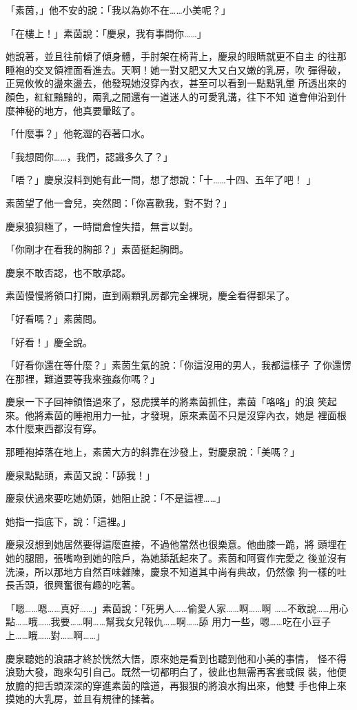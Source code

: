 「素茵，」他不安的說：「我以為妳不在……小美呢？」

「在樓上！」素茵說：「慶泉，我有事問你……」

她說著，並且往前傾了傾身體，手肘架在椅背上，慶泉的眼睛就更不自主
的往那睡袍的交叉領裡面看進去。天啊！她一對又肥又大又白又嫩的乳房，吹
彈得破，正晃攸攸的盪來盪去，他發現她沒穿內衣，甚至可以看到一點點乳暈
所透出來的顏色，紅紅黯黯的，兩乳之間還有一道迷人的可愛乳溝，往下不知
道會伸沿到什麼神秘的地方，他真要暈眩了。

「什麼事？」他乾澀的吞著口水。

「我想問你……，我們，認識多久了？」

「唔？」慶泉沒料到她有此一問，想了想說：「十……十四、五年了吧！
」

素茵望了他一會兒，突然問：「你喜歡我，對不對？」

慶泉狼狽極了，一時間倉惶失措，無言以對。

「你剛才在看我的胸部？」素茵挺起胸問。

慶泉不敢否認，也不敢承認。

素茵慢慢將領口打開，直到兩顆乳房都完全裸現，慶全看得都呆了。

「好看嗎？」素茵問。

「好看！」慶全說。

「好看你還在等什麼？」素茵生氣的說：「你這沒用的男人，我都這樣子
了你還愣在那裡，難道要等我來強姦你嗎？」

慶泉一下子回神領悟過來了，惡虎撲羊的將素茵抓住，素茵「咯咯」的浪
笑起來。他將素茵的睡袍用力一扯，才發現，原來素茵不只是沒穿內衣，她是
裡面根本什麼東西都沒有穿。

那睡袍掉落在地上，素茵大方的斜靠在沙發上，對慶泉說：「美嗎？」

慶泉點點頭，素茵又說：「舔我！」

慶泉伏過來要吃她奶頭，她阻止說：「不是這裡……」

她指一指底下，說：「這裡。」

慶泉沒想到她居然要得這麼直接，不過他當然也很樂意。他曲膝一跪，將
頭埋在她的腿間，張嘴吻到她的陰戶，為她舔舐起來了。素茵和阿賓作完愛之
後並沒有洗澡，所以那地方自然百味雜陳，慶泉不知道其中尚有典故，仍然像
狗一樣的吐長舌頭，很興奮很有趣的吃著。

「嗯……嗯……真好……」素茵說：「死男人……偷愛人家……啊……啊
……不敢說……用心點……哦……我要……啊……幫我女兒報仇……啊……舔
用力一些，嗯……吃在小豆子上……哦……對……啊……」

慶泉聽她的浪語才終於恍然大悟，原來她是看到也聽到他和小美的事情，
怪不得浪勁大發，跑來勾引自己。既然一切都明白了，彼此也無需再客套或假
裝，他便放膽的把舌頭深深的穿進素茵的陰道，再狠狠的將浪水掏出來，他雙
手也伸上來摸她的大乳房，並且有規律的揉著。

